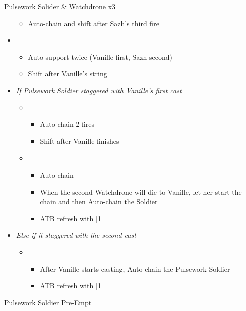 \begin{paracol}{2}
\begin{battle}{Pulsework Solider \& Watchdrone x3}
\begin{itemize}
\begin{itemize}
				      \item Auto-chain and shift after Sazh's third fire
			      \end{itemize}
			\item \second
			      \begin{itemize}
				      \item Auto-support twice (Vanille first, Sazh second)
				      \item Shift after Vanille's string
			      \end{itemize}
			\item \textit{If Pulsework Soldier staggered with Vanille's first cast}
			      \begin{itemize}
				      \item \first
				            \begin{itemize}
					            \item Auto-chain 2 fires
					            \item Shift after Vanille finishes
				            \end{itemize}
				      \item \fifth
				            \begin{itemize}
					            \item Auto-chain
					            \item When the second Watchdrone will die to Vanille, let her start the chain and then Auto-chain the Soldier
					            \item ATB refresh with [1]
				            \end{itemize}
			      \end{itemize}
			\item \textit{Else if it staggered with the second cast}
			      \begin{itemize}
				      \item \first
				            \begin{itemize}
					            \item After Vanille starts casting, Auto-chain the Pulsework Soldier
					            \item ATB refresh with [1]
				            \end{itemize}
			      \end{itemize}
		\end{itemize}
	\end{battle}
	\renewcommand{\first}{[1] Tri-disaster (\rav/\rav/\rav)}
	\renewcommand{\fourth}{[4] Variety (\rav/\sab/\med)}
	\switchcolumn*
	\begin{battle}{Pulsework Soldier Pre-Empt}

\end{battle}
\end{paracol}
